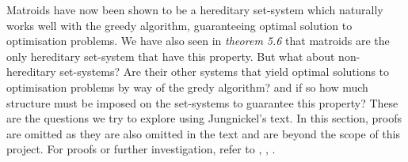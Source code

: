 \documentclass[../main.tex]{subfiles}
\begin{document}
\noindent Matroids have now been shown to be a hereditary set-system which naturally works well with the greedy algorithm, guaranteeing  optimal solution to optimisation problems. We have also seen in \textit{theorem 5.6} that matroids are the only hereditary set-system that have this property. But what about non-hereditary set-systems? Are their other systems that yield optimal solutions to optimisation problems by way of the gredy algorithm? and if so how much structure must be imposed on the set-systems to guarantee this property?
These are the questions we try to explore using Jungnickel's text.\cite{jungnickel} In this section, proofs are omitted as they are also omitted in the text and are beyond the scope of this project. For proofs or further investigation, refer to \cite{bryant_brooksbank}, \cite{kortez__lovasz}, \cite{greedoids}.
\end{document}
